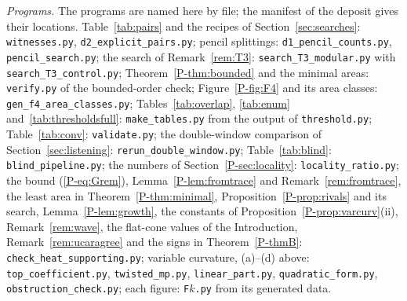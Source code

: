 \documentclass[pdflatex,sn-mathphys-num]{sn-jnl}
\newcommand{\pref}[1]{\ref*{P-#1}}%
\theoremstyle{thmstyleone}%
\theoremstyle{thmstylethree}%
\begin{document}
\emph{Programs.} The programs are named here by file; the manifest of the deposit gives their locations. Table~\ref{tab:pairs} and the recipes of Section~\ref{sec:searches}: \texttt{witnesses.py}, \texttt{d2\_explicit\_pairs.py}; pencil splittings: \texttt{d1\_pencil\_counts.py}, \texttt{pencil\_search.py}; the search of Remark~\ref{rem:T3}: \texttt{search\_T3\_modular.py} with \texttt{search\_T3\_control.py}; Theorem~\pref{thm:bounded} and the minimal areas: \texttt{verify.py} of the bounded-order check; Figure~\pref{fig:F4} and its area classes: \texttt{gen\_f4\_area\_classes.py}; Tables~\ref{tab:overlap}, \ref{tab:enum} and~\ref{tab:thresholdsfull}: \texttt{make\_tables.py} from the output of \texttt{threshold.py}; Table~\ref{tab:conv}: \texttt{validate.py}; the double-window comparison of Section~\ref{sec:listening}: \texttt{rerun\_double\_window.py}; Table~\ref{tab:blind}: \texttt{blind\_pipeline.py}; the numbers of Section~\pref{sec:locality}: \texttt{locality\_ratio.py}; the bound (\pref{eq:Grem}), Lemma~\pref{lem:fromtrace} and Remark~\ref{rem:fromtrace}, the least area in Theorem~\pref{thm:minimal}, Proposition~\pref{prop:rivals} and its search, Lemma~\pref{lem:growth}, the constants of Proposition~\pref{prop:varcurv}(ii), Remark~\ref{rem:wave}, the flat-cone values of the Introduction, Remark~\ref{rem:ucaragree} and the signs in Theorem~\pref{thmB}: \texttt{check\_heat\_supporting.py}; variable curvature, (a)--(d) above: \texttt{top\_coefficient.py}, \texttt{twisted\_mp.py}, \texttt{linear\_part.py}, \texttt{quadratic\_form.py}, \texttt{obstruction\_check.py}; each figure: \texttt{F}$k$\texttt{.py} from its generated data.


\end{document}
